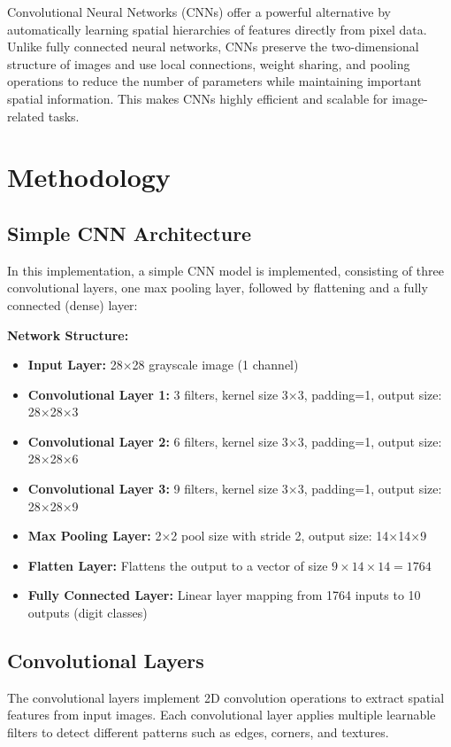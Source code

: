 \documentclass[conference]{IEEEtran}
\begin{document}
\noindent Convolutional Neural Networks (CNNs) offer a powerful alternative by automatically learning spatial hierarchies of features directly from pixel data. Unlike fully connected neural networks, CNNs preserve the two-dimensional structure of images and use local connections, weight sharing, and pooling operations to reduce the number of parameters while maintaining important spatial information. This makes CNNs highly efficient and scalable for image-related tasks.

\section{Methodology}
\subsection{Simple CNN Architecture}
In this implementation, a simple CNN model is implemented, consisting of three convolutional layers, one max pooling layer, followed by flattening and a fully connected (dense) layer:

\textbf{Network Structure:}
\begin{itemize}
    \item \textbf{Input Layer:} 28×28 grayscale image (1 channel)
    \item \textbf{Convolutional Layer 1:} 3 filters, kernel size 3×3, padding=1, output size: 28×28×3
    \item \textbf{Convolutional Layer 2:} 6 filters, kernel size 3×3, padding=1, output size: 28×28×6
    \item \textbf{Convolutional Layer 3:} 9 filters, kernel size 3×3, padding=1, output size: 28×28×9
    \item \textbf{Max Pooling Layer:} 2×2 pool size with stride 2, output size: 14×14×9
    \item \textbf{Flatten Layer:} Flattens the output to a vector of size \(9 \times 14 \times 14 = 1764\)
    \item \textbf{Fully Connected Layer:} Linear layer mapping from 1764 inputs to 10 outputs (digit classes)
\end{itemize}

\subsection{Convolutional Layers}
The convolutional layers implement 2D convolution operations to extract spatial features from input images. Each convolutional layer applies multiple learnable filters to detect different patterns such as edges, corners, and textures.
\end{document}
